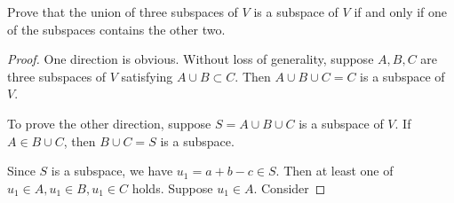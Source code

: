 \begin{exercise}{13}
	Prove that the union of three subspaces of \( V \) is a subspace of \( V \) if and only if one of the subspaces contains the other two.

\end{exercise}

\begin{proof}
	One direction is obvious. Without loss of generality, suppose \( A, B, C \) are three subspaces of \( V \) satisfying \( A \cup B \subset C \). Then \( A \cup B \cup C = C \) is a subspace of \( V \).
	
	To prove the other direction, suppose \( S = A \cup B \cup C \) is a subspace of \( V \). If \( A \in B \cup C \), then \( B \cup C = S \) is a subspace.

	Since \( S \) is a subspace, we have \( u_{1} = a + b - c \in S \). Then at least one of \( u_{1} \in A, u_{1} \in B, u_{1} \in C \) holds. Suppose \( u_{1} \in A \). Consider 


\end{proof}

